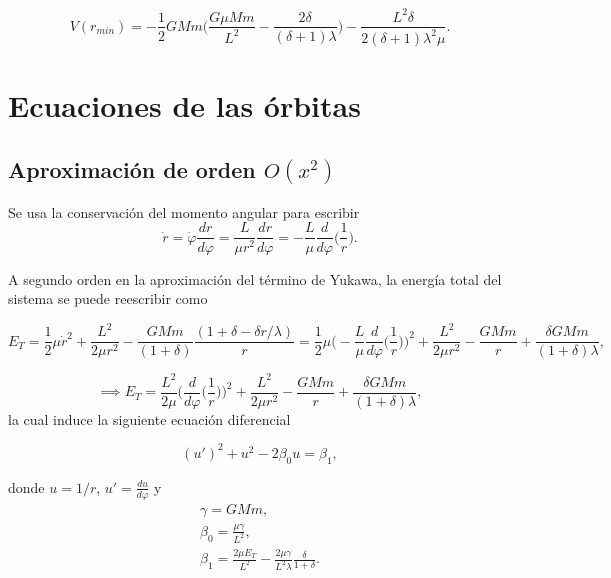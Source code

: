 \documentclass{article}
\begin{document}
\begin{equation}\label{order3V}
	V(r_{min})=-\frac{1}{2}GMm\Big(\frac{G\mu Mm}{L^2}-\frac{2\delta}{(\delta+1)\lambda}\Big)-\frac{L^2\delta}{2(\delta+1)\lambda^2\mu}.
\end{equation}

\section{Ecuaciones de las órbitas}
\subsection{Aproximación de orden $O(x^2)$}

Se usa la conservación del momento angular para escribir
\begin{equation}\label{rdot}
\dot{r}=\dot{\varphi}\frac{dr}{d\varphi}=\frac{L}{\mu r^2}\dfrac{dr}{d\varphi}=-\frac{L}{\mu}\frac{d}{d\varphi}\Big(\frac{1}{r}\Big).
\end{equation}

A segundo orden en la aproximación del término de Yukawa, la energía total del sistema se puede reescribir como

$$E_T=\frac{1}{2}\mu\dot{r}^2+\frac{L^2}{2\mu r^2}-\frac{GMm}{(1+\delta)}\frac{(1+\delta-\delta r/\lambda )}{r}=\frac{1}{2}\mu\Big(-\frac{L}{\mu}\frac{d}{d\varphi}\Big(\frac{1}{r}\Big)\Big)^2+\frac{L^2}{2\mu r^2}-\frac{GMm}{r}+\frac{\delta GMm}{(1+\delta)\lambda},$$

\begin{equation}\label{energyO2}
	\implies E_T=\frac{L^2}{2\mu}\Big(\frac{d}{d\varphi}\Big(\frac{1}{r}\Big)\Big)^2+\frac{L^2}{2\mu r^2}-\frac{GMm}{r}+\frac{\delta GMm}{(1+\delta)\lambda},
\end{equation}
la cual induce la siguiente ecuación diferencial

\begin{equation}\label{diffO2}
	(u')^2+u^2-2\beta_0 u=\beta_1,
\end{equation}

donde $u=1/r$, $u'=\frac{du}{d\varphi}$ y
\begin{gather}\label{constantsO2-I}
		\gamma=GMm,\\
		\beta_0= \frac{\mu\gamma}{L^2} \label{constantsO2-II},\\
		\beta_1=\frac{2\mu E_T}{L^2}-\frac{2\mu\gamma}{L^2\lambda}\frac{\delta}{1+\delta} \label{constantsO2-III}.
\end{gather}
\end{document}
